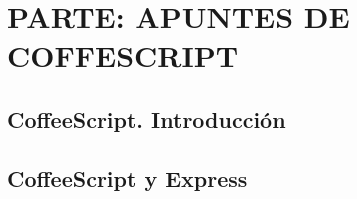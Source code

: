 \documentclass[11pt,a4paper,oneside,onecolumn]{book}
\begin{document}

\part{PARTE: APUNTES DE COFFESCRIPT}
\chapter{CoffeeScript. Introducción}
\label{chapter:coffeescript}


\chapter{CoffeeScript y Express}
\label{chapter:coffeescriptexpress}


%
%
%
%
%
%
%
%

%
%

\tableofcontents 
\listoffigures
\listoftables

\printindex


%
%

\end{document}
